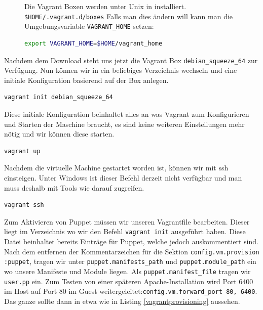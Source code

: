 \documentclass[12pt,a4paper,ngerman]{article}
\begin{document}
\begin{figure}
\vspace{-20pt}
\begin{boxedminipage}{4.5cm}
 Die Vagrant Boxen werden unter Unix in installiert. \lstinline!$HOME/.vagrant.d/boxes!
Falls man dies ändern will kann man die Umgebungsvariable \lstinline$VAGRANT_HOME$ setzen:
\begin{lstlisting}[language=sh,label=vagrant-home,frame=none,numbers=none]
export VAGRANT_HOME=$HOME/vagrant_home
\end{lstlisting}
\end{boxedminipage}
\vspace{-20pt}
\end{figure}
 

Nachdem dem Download steht uns jetzt die  Vagrant Box \lstinline$debian_squeeze_64$ zur Verfügung. Nun können wir in ein beliebiges Verzeichnis wechseln und eine initiale Konfiguration basierend auf der Box anlegen.

\begin{lstlisting}[language=sh,caption=Vagrant initialisieren, label=vagrant-init]
vagrant init debian_squeeze_64
\end{lstlisting}

Diese initiale Konfiguration beinhaltet alles an was Vagrant zum Konfigurieren und Starten der Maschine braucht, es sind keine weiteren Einstellungen mehr nötig und wir können diese starten.

\begin{lstlisting}[language=sh,caption=Starten der Vagrant Maschine, label=vagrant-up]
vagrant up
\end{lstlisting}

Nachdem die virtuelle Machine gestartet worden ist, können wir mit ssh einsteigen. Unter Windows ist dieser Befehl derzeit nicht verfügbar und man muss deshalb mit Tools wie \cite{putty} darauf zugreifen.
\begin{lstlisting}[language=sh,caption=Mit ssh in der Vagrant Maschine einsteigen, label=vagrant-ssh]
vagrant ssh
\end{lstlisting}
 
Zum Aktivieren von Puppet müssen wir unseren Vagrantfile bearbeiten. Dieser liegt im Verzeichnis wo wir den Befehl \lstinline$vagrant init$ ausgeführt haben. Diese Datei beinhaltet bereits Einträge für Puppet, welche jedoch auskommentiert sind. Nach dem entfernen der Kommentarzeichen für die Sektion \lstinline$config.vm.provision :puppet$, tragen wir unter \lstinline$puppet.manifests_path$ und \lstinline$puppet.module_path$ ein wo unsere Manifeste und Module liegen. Als \lstinline$puppet.manifest_file$ tragen wir \lstinline$user.pp$ ein. Zum Testen von einer späteren Apache-Installation wird Port 6400 im Host auf Port 80 im Guest weitergeleitet:\lstinline$config.vm.forward_port 80, 6400$. Das ganze sollte dann in etwa wie in Listing \ref{vagrantprovisioning} aussehen.
  
\end{document}
